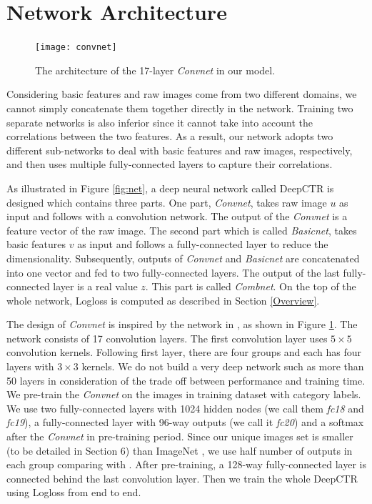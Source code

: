 \documentclass{sig-alternate}
\begin{document}
\section{Network Architecture}
\begin{figure}
	\centering
	\texttt{[image: convnet]}
	\caption{The architecture of the 17-layer \emph{Convnet} in our model.}
	\label{fig:convnet}
\end{figure}
Considering basic features and raw images come from two different domains, we cannot simply concatenate them together directly in the network. Training two separate networks is also inferior since it cannot take into account the correlations between the two features. As a result, our network adopts two different sub-networks to deal with basic features and raw images, respectively, and then uses multiple fully-connected layers to capture their correlations. 

As illustrated in Figure \ref{fig:net},  a  deep neural network called DeepCTR is designed which contains three parts. 
One part, \emph{Convnet}, takes raw image $u$ as input and follows with a convolution network. 
The output of the \emph{Convnet} is a feature vector of the raw image. 
The second part which is called \emph{Basicnet}, takes basic features $v$ as input and follows a fully-connected layer to reduce the dimensionality. 
Subsequently, outputs of \emph{Convnet} and \emph{Basicnet} are concatenated into one vector and fed to two fully-connected layers. 
The output of the last fully-connected layer is a real value $z$.
This part is called \emph{Combnet}. On the top of the whole network, Logloss is computed as described in Section \ref{Overview}.

The design of \emph{Convnet} is inspired by the network in \cite{he2015deep,simonyan2014very}, as shown in Figure \ref{fig:convnet}. The network consists of 17 convolution layers. The first convolution layer uses $5 \times 5$ convolution kernels. Following first layer, there are four groups and each has four layers with $3 \times 3$ kernels.  We do not build a very deep network such as more than 50 layers in consideration of the trade off between performance and training time. We pre-train the \emph{Convnet} on the images in training dataset with category labels. We use two fully-connected layers with 1024 hidden nodes (we call them \emph{fc18} and \emph{fc19}), a fully-connected layer with 96-way outputs (we call it \emph{fc20}) and a softmax after the \emph{Convnet} in pre-training period.  Since our unique images set is smaller (to be detailed in Section 6) than ImageNet \cite{deng2009imagenet}, we use half number of outputs in each group comparing with \cite{he2015deep}. After pre-training,  a 128-way fully-connected layer is connected behind the last convolution layer.  Then we train the whole DeepCTR using Logloss from end to end.
\end{document}
